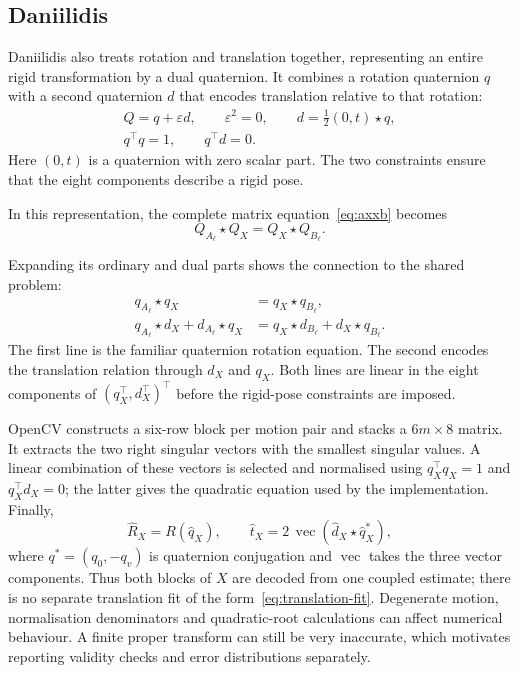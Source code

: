 \documentclass[12pt,a4paper]{article}
\begin{document}
\subsection{Daniilidis}
Daniilidis also treats rotation and translation together, representing an entire rigid transformation by a dual quaternion. It combines a rotation quaternion $q$ with a second quaternion $d$ that encodes translation relative to that rotation:
\begin{equation}\label{eq:dual}
\begin{gathered}
Q=q+\varepsilon d,\qquad \varepsilon^2=0,\qquad
d=\tfrac12(0,t)\star q,\\
q^\top q=1,\qquad q^\top d=0.
\end{gathered}
\end{equation}
Here $(0,t)$ is a quaternion with zero scalar part. The two constraints ensure that the eight components describe a rigid pose.

\begin{samepage}
In this representation, the complete matrix equation~\eqref{eq:axxb} becomes
\begin{equation}\label{eq:dual-handeye}
Q_{A_\ell}\star Q_X=Q_X\star Q_{B_\ell}.
\end{equation}
\end{samepage}
Expanding its ordinary and dual parts shows the connection to the shared problem:
\begin{align}
q_{A_\ell}\star q_X&=q_X\star q_{B_\ell},\label{eq:dual-rotation}\\
q_{A_\ell}\star d_X+d_{A_\ell}\star q_X
&=q_X\star d_{B_\ell}+d_X\star q_{B_\ell}.
\label{eq:dual-translation}
\end{align}
The first line is the familiar quaternion rotation equation. The second encodes the translation relation through $d_X$ and $q_X$. Both lines are linear in the eight components of $(q_X^\top,d_X^\top)^\top$ before the rigid-pose constraints are imposed.

OpenCV constructs a six-row block per motion pair and stacks a $6m\times8$ matrix. It extracts the two right singular vectors with the smallest singular values. A linear combination of these vectors is selected and normalised using $q_X^\top q_X=1$ and $q_X^\top d_X=0$; the latter gives the quadratic equation used by the implementation. Finally,
\begin{equation}\label{eq:dual-recovery}
\widehat R_X=R(\widehat q_X),\qquad
\widehat t_X=2\,\operatorname{vec}(\widehat d_X\star\widehat q_X^*),
\end{equation}
where $q^*=(q_0,-q_v)$ is quaternion conjugation and $\operatorname{vec}$ takes the three vector components. Thus both blocks of $X$ are decoded from one coupled estimate; there is no separate translation fit of the form~\eqref{eq:translation-fit}. Degenerate motion, normalisation denominators and quadratic-root calculations can affect numerical behaviour. A finite proper transform can still be very inaccurate, which motivates reporting validity checks and error distributions separately. \cite{daniilidis,opencvsource}
\end{document}
